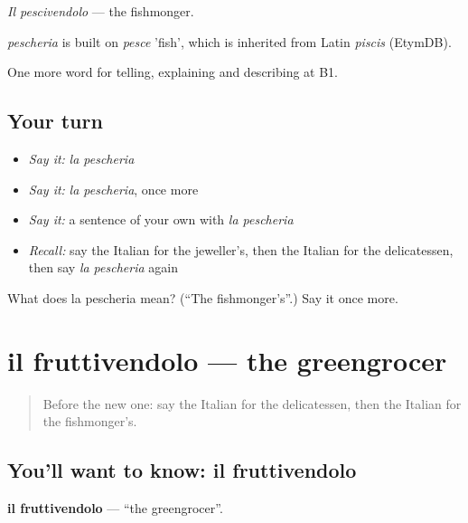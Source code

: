 \emph{Il pescivendolo} — the fishmonger.

\begin{cousinweb}
\emph{pescheria} is built on \emph{pesce} 'fish', which is inherited from Latin \emph{piscis} (EtymDB).
\end{cousinweb}

\begin{grammarlens}[title={What you've built}]
One more word for telling, explaining and describing at B1.
\end{grammarlens}

\subsection*{Your turn}
\begin{itemize}
\raggedright
  \item \emph{Say it:} \emph{la pescheria}
  \item \emph{Say it:} \emph{la pescheria}, once more
  \item \emph{Say it:} a sentence of your own with \emph{la pescheria}
  \item \emph{Recall:} say the Italian for the jeweller's, then the Italian for the delicatessen, then say \emph{la pescheria} again
\end{itemize}

\begin{tcolorbox}[breakable,colback=teal!4,colframe=teal!35!black,title={Before you move on}]
What does la pescheria mean? (\textquotedblleft{}The fishmonger's\textquotedblright{}.) Say it once more.
\end{tcolorbox}
\section[il fruttivendolo]{il fruttivendolo — the greengrocer}

\label{lesson:IT-C454-fruttivendolo}



\begin{quote}
Before the new one: say the Italian for the delicatessen, then the Italian for the fishmonger's.
\end{quote}

\subsection*{You'll want to know: il fruttivendolo}
\textbf{il fruttivendolo} — \textquotedblleft{}the greengrocer\textquotedblright{}.


